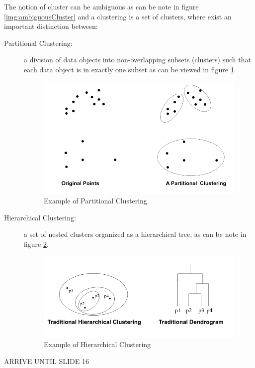 The notion of cluster can be ambiguous as can be note in figure \ref{img:ambiguousCluster} and a clustering is a set of clusters, where exist
an important distinction between:
\begin{description}
    \item [Partitional Clustering: ] a division of data objects into non-overlapping subsets (clusters) such that each data object is in exactly one subset
    				     as can be viewed in figure \ref{img:partitionalCluster}.

				     \begin{figure}
				         \caption{Example of Partitional Clustering}
					 \label{img:partitionalCluster}
					 \includegraphics[width=\textwidth]{Images/partitional}
				     \end{figure}

    \item [Hierarchical Clustering: ] a set of nested clusters organized as a hierarchical tree, as can be note in figure \ref{img:hierarchicalCluster}.

    				      \begin{figure}
				          \caption{Example of Hierarchical Clustering}
					  \label{img:hierarchicalCluster}
					  \includegraphics[width=\textwidth]{Images/hierarchical}
				      \end{figure}
\end{description}
ARRIVE UNTIL SLIDE 16


